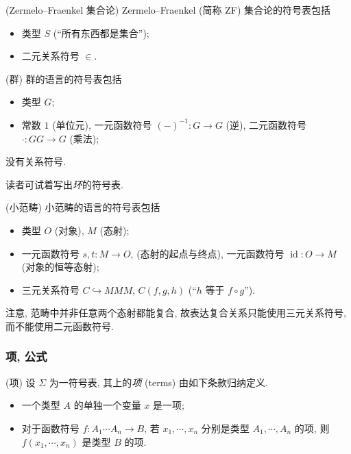 \begin{example}
	[label={Zermelo--Fraenkel-language}]
	{(Zermelo--Fraenkel 集合论)}
	Zermelo--Fraenkel (简称 ZF) 集合论的符号表包括
	\begin{itemize}
		\item 类型 $S$ (``所有东西都是集合'');
		\item 二元关系符号 $\in$.
	\end{itemize}
\end{example}

\begin{example}
	[label={group-language}]
	{(群)}
	群的语言的符号表包括
	\begin{itemize}
		\item 类型 $G$;
		\item 常数 $1$ (单位元), 一元函数符号 $(-)^{-1}\colon G\to G$ (逆), 二元函数符号 $\cdot\colon GG \to G$ (乘法);
	\end{itemize}
	没有关系符号\footnotemark.
	
	读者可试着写出\emph{环}的符号表.
\end{example}


\begin{example}
	[label={small-category-language}]
	{(小范畴)}
	小范畴的语言的符号表包括
	\begin{itemize}
		\item 类型 $O$ (对象), $M$ (态射);
		\item 一元函数符号 $s,t\colon M\to O$,
		(态射的起点与终点), 一元函数符号 $\operatorname{id}\colon O\to M$
		(对象的恒等态射);
		\item 三元关系符号 $C\hookrightarrow MMM$,
		$C(f,g,h)$ (``$h$ 等于 $f\circ g$'').
	\end{itemize}
	注意, 范畴中并非任意两个态射都能复合, 故表达复合关系只能使用三元关系符号, 而不能使用二元函数符号.
\end{example}

\subsubsection{项, 公式}

\begin{definition}
	[label={definition-terms}]
	{(项)}
	设 $\Sigma$ 为一符号表, 其上的\emph{项} (terms) 由如下条款归纳定义.
	\begin{itemize}
		\item 一个类型 $A$ 的单独一个变量 $x$ 是一项;
		\item 对于函数符号 $f \colon A_1\cdots A_n \to B$, 若 $x_1,\cdots,x_n$ 分别是类型 $A_1,\cdots,A_n$ 的项, 则 $f(x_1,\cdots,x_n)$ 是类型 $B$ 的项.
	\end{itemize}
\end{definition}

